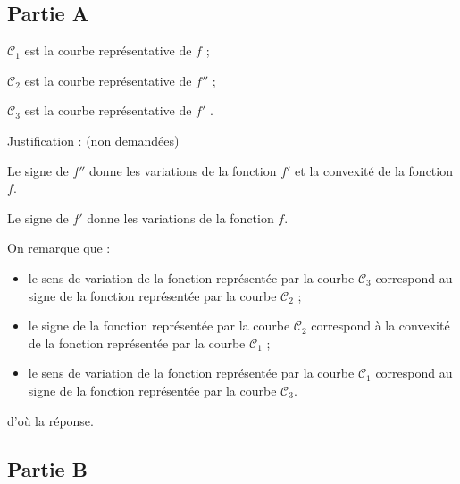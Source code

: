 \subsection*{Partie A}


	$\mathcal{C}_{1}$ est la courbe représentative de $f$ ;

	$\mathcal{C}_{2}$ est la courbe représentative de $f''$ ;

	$\mathcal{C}_{3}$ est la courbe représentative de  $f'$ .

	Justification :  (non demandées)

	Le signe de $f''$ donne les variations de la fonction $f'$ et la convexité de la fonction $f$.

	Le signe de $f'$ donne les variations de la fonction $f$.

	On remarque que  :
	\begin{itemize}
		\item le sens de variation de la fonction représentée par la courbe $\mathcal{C}_{3}$ correspond  au signe de la fonction représentée par  la courbe $\mathcal{C}_{2}$ ;

		\item le signe de la fonction représentée par la courbe $\mathcal{C}_{2}$ correspond à la convexité de la fonction représentée par la courbe $\mathcal{C}_{1}$ ;

		\item  le sens de variation de la fonction représentée par la courbe $\mathcal{C}_{1}$ correspond  au signe de la fonction représentée par  la courbe $\mathcal{C}_{3}$.
	\end{itemize}
	d'où la réponse.



	\subsection*{Partie B}


